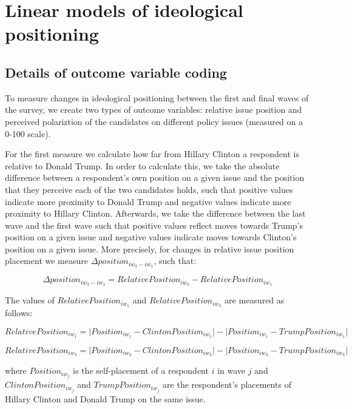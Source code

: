 \documentclass[
  12pt,
]{article}
\begin{document}
\clearpage

\hypertarget{linear-models-of-ideological-positioning}{%
\section{Linear models of ideological positioning}\label{linear-models-of-ideological-positioning}}

\hypertarget{details-of-outcome-variable-coding}{%
\subsection{Details of outcome variable coding}\label{details-of-outcome-variable-coding}}

To measure changes in ideological positioning between the first and final waves of the survey, we create two types of outcome variables: relative issue position and perceived polariztion of the candidates on different policy issues (measured on a 0-100 scale).

For the first measure we calculate how far from Hillary Clinton a respondent is relative to Donald Trump. In order to calculate this, we take the absolute difference between a respondent's own position on a given issue and the position that they perceive each of the two candidates holds, such that positive values indicate more proximity to Donald Trump and negative values indicate more proximity to Hillary Clinton. Afterwards, we take the difference between the last wave and the first wave such that positive values reflect moves towards Trump's position on a given issue and negative values indicate moves towards Clinton's position on a given issue. More precisely, for changes in relative issue position placement we measure \(\Delta position_{{iw_{3}}-{iw_{1}}}\), such that:

\[\Delta position_{{iw_{3}}-{iw_{1}}} = RelativePosition_{iw_{3}} - RelativePosition_{iw_{1}}\]

The values of \(RelativePosition_{iw_{1}}\) and \(RelativePosition_{iw_{3}}\) are measured as follows:

\[RelativePosition_{iw_{1}} = \lvert Position_{iw_{1}} - ClintonPosition_{iw_{1}} \rvert - \lvert Position_{iw_{1}} - TrumpPosition_{iw_{1}} \rvert \]

\[RelativePosition_{iw_{3}} = \lvert Position_{iw_{3}} - ClintonPosition_{iw_{3}} \rvert - \lvert Position_{iw_{3}} - TrumpPosition_{iw_{3}} \rvert \]

where \(Position_{iw_{j}}\) is the self-placement of a respondent \(i\) in wave \(j\) and \(ClintonPosition_{iw_{j}}\) and \(TrumpPosition_{iw_{j}}\) are the respondent's placements of Hillary Clinton and Donald Trump on the same issue.
\end{document}
